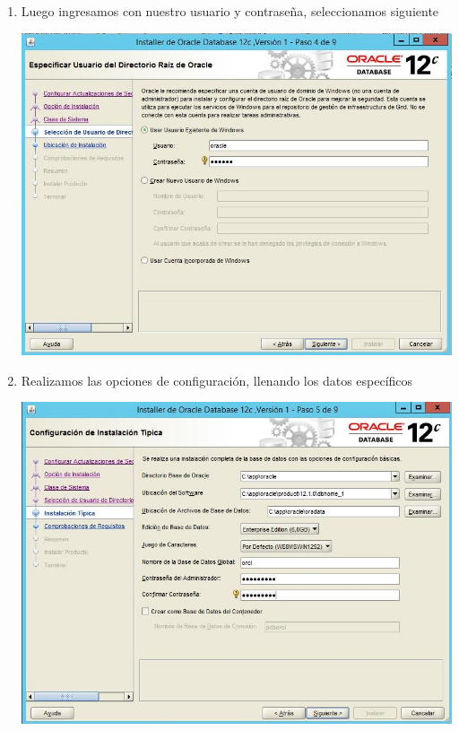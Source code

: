 \begin{enumerate}[1.]
	\item Luego ingresamos con nuestro usuario y contraseña, seleccionamos siguiente\\
	\begin{center}
	\includegraphics[width=15cm]{./Imagenes/img16} 
	\end{center}

	\item Realizamos las opciones de configuraci\'on, llenando los datos espec\'ificos\\
	\begin{center}
	\includegraphics[width=15cm]{./Imagenes/img17} 
	\end{center}


\end{enumerate}
